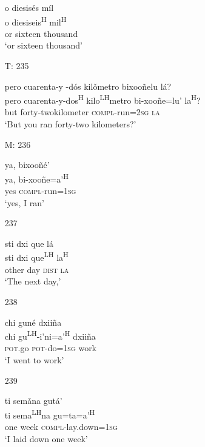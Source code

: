 \begin{itemize}
\glll   o diesis\'{e}s m\'{i}l\\
 o diesiseis\textsuperscript{H} mil\textsuperscript{H}\\
or sixteen thousand\\
\glt `or sixteen thousand'
 


\item[T: 235]
 
\glll   pero cuarenta-y -d\'{o}s kil\v{o}metro bixoo\~{n}elu l\'{a}?\\
pero cuarenta-y-dos\textsuperscript{H} kilo\textsuperscript{LH}metro bi-xoo\~{n}e=lu' la\textsuperscript{H}?\\
but forty-twokilometer \textsc{compl}-run=\textsc{2sg} \textsc{la}\\
\glt `But you ran forty-two kilometers?'
 

\item[M: 236]
 
\glll   ya, bixoo\~{n}\'{e}'\\
 ya, bi-xoo\~{n}e=a'\textsuperscript{H}\\
yes \textsc{compl}-run=\textsc{1sg}\\
\glt `yes, I ran'
 



\item[237]

\glll   sti dxi que l\'{a}\\
 sti dxi que\textsuperscript{LH} la\textsuperscript{H}\\
other day \textsc{dist} \textsc{la}\\
\glt `The next day,'
 

\item[238]
 
\glll   chi gun\'{e} dxii\~{n}a\\
  chi gu\textsuperscript{LH}-i'ni=a'\textsuperscript{H} dxii\~{n}a\\
\textsc{pot}.go \textsc{pot}-do=\textsc{1sg} work\\
\glt `I went to work'
 



\item[239]
 
\glll   ti sem\v{a}na gut\'{a}'\\
 ti sema\textsuperscript{LH}na gu=ta=a'\textsuperscript{H}\\
one week \textsc{compl}-lay.down=\textsc{1sg}\\
\glt `I laid down one week' 
 



\end{itemize}
